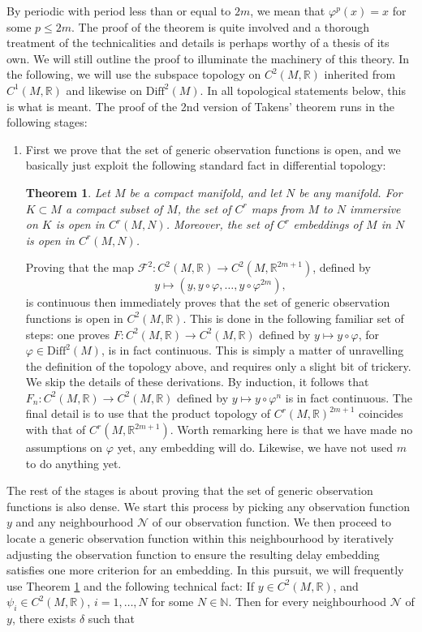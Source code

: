 \documentclass[11pt, a4paper]{memoir}
\theoremstyle{break}
\newtheorem{thm}{Theorem}
\theoremstyle{break}
\theoremstyle{nonumberplain}
\newcommand{\mN}{\mathbb{N}}
\newcommand{\mR}{\mathbb{R}}
\begin{document}
By periodic with period less than or equal to $2m$, we mean that $\varphi^{p}(x)=x$ for some $p\leqslant 2m$. The proof of the theorem is quite involved and a thorough treatment of the technicalities and details is perhaps worthy of a thesis of its own. We will still outline the proof to illuminate the machinery of this theory. In the following, we will use the subspace topology on $C^2(M,\mR)$ inherited from $C^1(M,\mR)$ and likewise on $\text{Diff}^2(M)$. In all topological statements below, this is what is meant. The proof of the 2nd version of Takens' theorem runs in the following stages:
\begin{enumerate}[label=\roman*)]
	\item First we prove that the set of generic observation functions is open, and we basically just exploit the following standard fact in differential topology:
	\begin{thm}\label{tool}
	Let $M$ be a compact manifold, and let $N$ be any manifold. For $K\subset M$ a compact subset of $M$, the set of $C^r$ maps from $M$ to $N$ immersive on $K$ is open in $C^r(M,N)$. Moreover, the set of $C^r$ embeddings of $M$ in $N$ is open in $C^r(M,N)$. \cite{hirsch}
	\end{thm}
	Proving that the map $\mathcal{F}^2: C^2(M,\mR)\to C^2(M,\mR^{2m+1})$, defined by $$y\mapsto (y,y\circ\varphi,\ldots, y\circ \varphi^{2m}),$$ 
	is continuous then immediately proves that the set of generic observation functions is open in $C^2(M,\mR)$. This is done in the following familiar set of steps: one proves $F: C^2(M,\mR)\to C^2(M,\mR)$ defined by $y\mapsto y\circ\varphi$, for $\varphi\in \text{Diff}^2(M)$, is in fact continuous.  This is simply a matter of unravelling the definition of the topology above, and requires only a slight bit of trickery. We skip the details of these derivations. By induction, it follows that $F_n:  C^2(M,\mR)\to C^2(M,\mR)$ defined by $y\mapsto y\circ\varphi^n$ is in fact continuous.  The final detail is to use that the product topology of $C^r(M,\mR)^{2m+1}$ coincides with that of $C^r(M,\mR^{2m+1})$. Worth remarking here is that we have made no assumptions on $\varphi$ yet, any embedding will do. Likewise, we have not used $m$ to do anything yet. 
\end{enumerate}
The rest of the stages is about proving that the set of generic observation functions is also dense. We start this process by picking any observation function $y$ and any neighbourhood $\mathcal{N}$ of our observation function. We then proceed to locate a generic observation function within this neighbourhood by iteratively adjusting the observation function to ensure the resulting delay embedding satisfies one more criterion for an embedding. In this pursuit, we will frequently use Theorem \ref{tool} and the following technical fact: If $y\in C^2(M,\mR)$, and $\psi_i\in C^2(M,\mR)$, $i=1,\ldots,N$ for some $N\in \mN$. Then for every neighbourhood $\mathcal{N}$ of $y$, there exists $\delta$ such that
\end{document}
